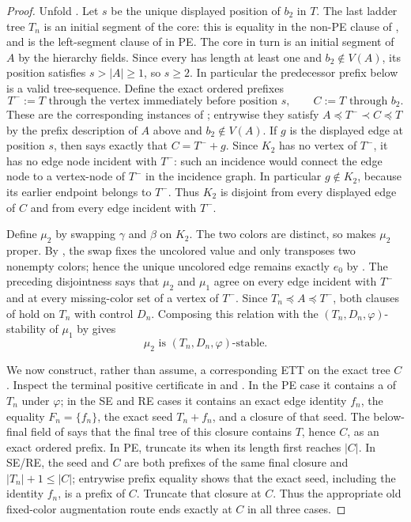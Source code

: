 \begin{proof}
Unfold .  Let $s$ be the unique displayed
position of $b_2$ in $T$.  The last ladder tree $T_n$ is an initial
segment of the core: this is equality in the non-PE clause of
, and is the left-segment clause of
 in PE.  The core in turn is an initial segment
of $A$ by the hierarchy fields.  Since every  has
length at least one and $b_2\notin V(A)$, its position satisfies
$s>|A|\geq1$, so $s\geq2$.  In particular the predecessor prefix below
is a valid tree-sequence.  Define the exact ordered prefixes
\[
 T^-:=T\text{ through the vertex immediately before position }s,
 \qquad C:=T\text{ through }b_2.
                                                               \tag{4}
\]
These are the corresponding instances of
; entrywise they satisfy
$A\preccurlyeq T^-\prec C\preccurlyeq T$ by the prefix description of
$A$ above and $b_2\notin V(A)$.  If $g$ is the displayed edge at
position $s$, then  says exactly that
$C=T^-+g$.  Since $K_2$ has no vertex of $T^-$, it has no edge node
incident with $T^-$: such an incidence would connect the edge node to a
vertex-node of $T^-$ in the incidence graph.  In particular $g\notin
K_2$, because its earlier endpoint belongs to $T^-$.  Thus $K_2$ is
disjoint from every displayed edge of $C$ and from every edge incident
with $T^-$.

Define $\mu_2$ by swapping $\gamma$ and $\beta$ on $K_2$.  The two
colors are distinct, so  makes
$\mu_2$ proper.  By , the swap fixes the
uncolored value and only transposes two nonempty colors; hence the unique
uncolored edge remains exactly $e_0$ by
.  The preceding disjointness says
that $\mu_2$ and $\mu_1$ agree on every edge incident with $T^-$ and at
every missing-color set of a vertex of $T^-$.  Since
$T_n\preccurlyeq A\preccurlyeq T^-$, both clauses of
 hold on $T_n$ with control $D_n$.  Composing
this relation with the $(T_n,D_n,\varphi)$-stability of $\mu_1$ by
 gives
\[
       \mu_2\text{ is }(T_n,D_n,\varphi)\text{-stable}.        \tag{5}
\]

We now construct, rather than assume, a corresponding ETT on the exact
tree $C$.  Inspect the terminal positive certificate in
 and
.  In the PE case it contains a
 of $T_n$ under $\varphi$; in the SE and RE
cases it contains an exact edge identity $f_n$, the equality
$F_n=\{f_n\}$, the exact seed $T_n+f_n$, and a closure of that seed.
The below-final field of  says that the
final tree of this closure contains $T$, hence $C$, as an exact ordered
prefix.  In PE, truncate its
 when its length first reaches
$|C|$.  In SE/RE, the seed and $C$ are both prefixes of the same final
closure and $|T_n|+1\leq |C|$; entrywise prefix equality shows that the
exact seed, including the identity $f_n$, is a prefix of $C$.  Truncate
that closure at $C$.  Thus the appropriate old fixed-color augmentation
route ends exactly at $C$ in all three cases.


\end{proof}
